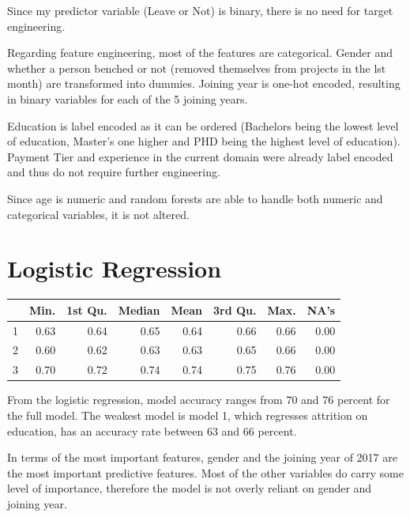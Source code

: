 \documentclass[11pt,preprint, authoryear]{elsarticle}
\let\origtable\table
\let\endorigtable\endtable
\renewenvironment{table}[1][2] {
    \expandafter\origtable\expandafter[H]
} {
    \endorigtable
}
\numberwithin{equation}{section}
\numberwithin{figure}{section}
\numberwithin{table}{section}
\begin{document}
Since my predictor variable (Leave or Not) is binary, there is no need
for target engineering.

Regarding feature engineering, most of the features are categorical.
Gender and whether a person benched or not (removed themselves from
projects in the lst month) are transformed into dummies. Joining year is
one-hot encoded, resulting in binary variables for each of the 5 joining
years.

Education is label encoded as it can be ordered (Bachelors being the
lowest level of education, Master's one higher and PHD being the highest
level of education). Payment Tier and experience in the current domain
were already label encoded and thus do not require further engineering.

Since age is numeric and random forests are able to handle both numeric
and categorical variables, it is not altered.

\hypertarget{logistic-regression}{%
\section*{Logistic Regression}\label{logistic-regression}}

\begin{table}[H]
\centering
\begin{tabular}{rrrrrrrr}
  \hline
 & Min. & 1st Qu. & Median & Mean & 3rd Qu. & Max. & NA's \\ 
  \hline
1 & 0.63 & 0.64 & 0.65 & 0.64 & 0.66 & 0.66 & 0.00 \\ 
  2 & 0.60 & 0.62 & 0.63 & 0.63 & 0.65 & 0.66 & 0.00 \\ 
  3 & 0.70 & 0.72 & 0.74 & 0.74 & 0.75 & 0.76 & 0.00 \\ 
   \hline
\end{tabular}
\caption{Short Table Example \label{tab1}} 
\end{table}

From the logistic regression, model accuracy ranges from 70 and 76
percent for the full model. The weakest model is model 1, which
regresses attrition on education, has an accuracy rate between 63 and 66
percent.

In terms of the most important features, gender and the joining year of
2017 are the most important predictive features. Most of the other
variables do carry some level of importance, therefore the model is not
overly reliant on gender and joining year.
\end{document}

